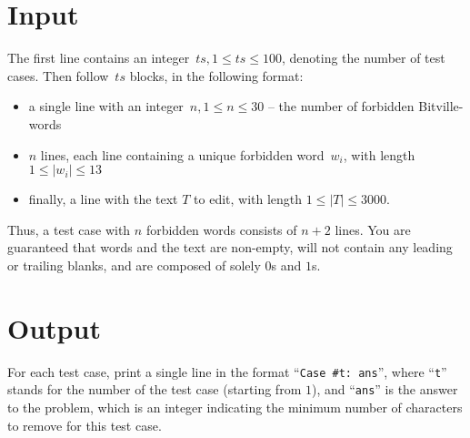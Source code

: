 \section*{Input}
The first line contains an integer~$ts, 1 \leq ts \leq 100$, denoting the number of test cases.
Then follow~$ts$ blocks, in the following format:
\begin{itemize}
  \item a single line with an integer~$n, 1\leq n \leq 30$ -- the number of forbidden Bitville-words
  \item $n$ lines, each line containing a unique forbidden word~$w_i$, with length $1 \leq |w_i| \leq 13$ 
  \item finally, a line with the text $T$ to edit, with length $1 \leq |T| \leq 3000.$
\end{itemize}
Thus, a test case with $n$ forbidden words consists of $n+2$ lines. You are guaranteed that words and the text are non-empty, will not contain any leading or trailing blanks,
and are composed of solely $0$s and $1$s.

\section*{Output}
For each test case, print a single line in the format ``{\texttt{Case \#t: ans}}'', where ``{\texttt{t}}'' stands for the number of the test case (starting from $1$), and ``{\texttt{ans}}'' is the answer to the problem, which is an integer indicating the minimum number of characters to remove for this test case.

